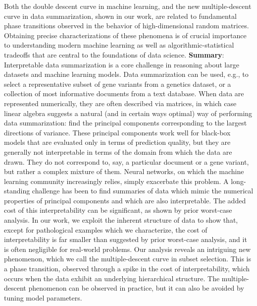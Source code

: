 \documentclass[11pt, oneside]{article}   	%
\begin{document}
Both the double descent curve in machine learning, and the new
multiple-descent curve in data summarization, shown in our work, are
related to fundamental phase transitions observed in the behavior of
high-dimensional random matrices. Obtaining precise characterizations
of these phenomena is of crucial importance to understanding modern
machine learning as well as algorithmic-statistical tradeoffs that are
central to the foundations of data science.
\vfill
\textbf{Summary}:
Interpretable data summarization is a core challenge in reasoning
about large datasets and machine learning models.  Data summarization
can be used, e.g., to select a representative subset of gene variants
from a genetics dataset, or a collection of most informative documents
from a text database.  When data are represented numerically, they are
often described via matrices, in which case linear algebra suggests a
natural (and in certain ways optimal) way of performing data
summarization: find the principal components corresponding to the
largest directions of variance.  These principal components work well
for black-box models that are evaluated only in terms of prediction
quality, but they are generally not interpretable in terms of the
domain from which the data are drawn. They do not correspond to, say,
a particular document or a gene variant, but rather a complex mixture
of them.  Neural networks, on which the machine learning community
increasingly relies, simply exacerbate this problem.  A long-standing
challenge has been to find summaries of data which mimic the numerical
properties of principal components and which are also
interpretable. The added cost of this interpretability can be
significant, as shown by prior worst-case analysis.  In our work, we
exploit the inherent structure of data to show that, except for
pathological examples which we characterize, the cost of
interpretability is far smaller than suggested by prior worst-case
analysis, and it is often negligible for real-world problems.  Our
analysis reveals an intriguing new phenomenon, which we call the
multiple-descent curve in subset selection.  This is a phase
transition, observed through a spike in the cost of interpretability,
which occurs when the data exhibit an underlying hierarchical
structure.  The multiple-descent phenomenon can be observed in
practice, but it can also be avoided by tuning model parameters. 
\end{document}
